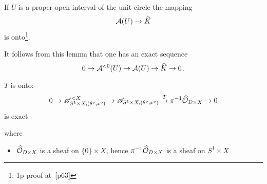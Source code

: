 \begin{paracol}{2} %
  \begin{lem}[2.2.5]
    If $U$ is a proper open interval of the unit circle the mapping
    \[
      \mathcal{A}(U)\to\widehat{K}
    \]
    is onto\footnote{1p proof at~\cite{sabbah_cimpa90}[p63]}.
  \end{lem}

  It follows from this lemma that one has an exact sequence
  \[
    0 \to \mathcal{A}^{<0}(U) \to \mathcal{A}(U) \to \widehat{K} \to 0 \,.
  \]
  
  \switchcolumn{} %
  \begin{lem}
    $T$ is onto:
    \[
      0 \to              \mathscr{A}_{S^1\times X,(\theta^o,x^o)}^{<X}
        \to              \mathscr{A}_{S^1\times X,(\theta^o,x^o)}
        \overset{T}{\to} \pi^{-1}\widehat{\mathcal{O}}_{D\times X}
        \to 0
    \]
    is exact
  \end{lem}
  where
  \begin{itemize}
    \item $\widehat{\mathcal{O}}_{D\times X}$ is a sheaf on $\{0\}\times X$, hence
      $\pi^{-1}\widehat{\mathcal{O}}_{D\times X}$ is a sheaf on $S^1\times X$
  \end{itemize}

\end{paracol} %


